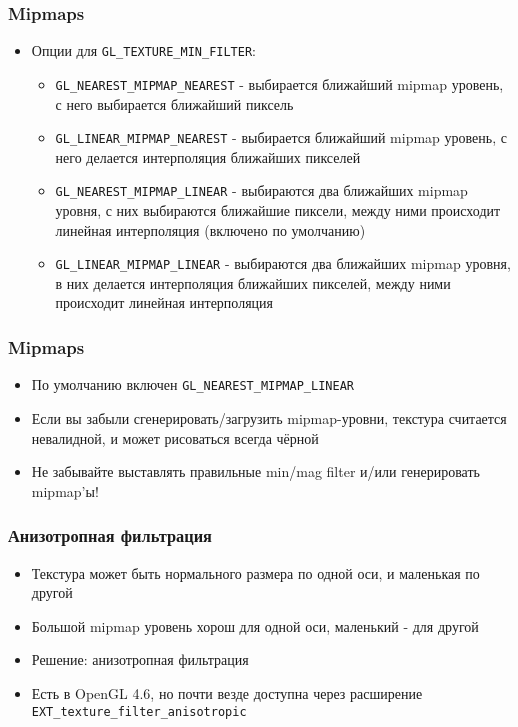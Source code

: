 \documentclass{beamer}
\begin{document}
\begin{frame}[fragile]
\frametitle{Mipmaps}
\begin{itemize}
\item Опции для \verb|GL_TEXTURE_MIN_FILTER|:
\pause
\begin{itemize}
\item \verb|GL_NEAREST_MIPMAP_NEAREST| - выбирается ближайший mipmap уровень, с него выбирается ближайший пиксель
\pause
\item \verb|GL_LINEAR_MIPMAP_NEAREST| - выбирается ближайший mipmap уровень, с него делается интерполяция ближайших пикселей
\pause
\item \verb|GL_NEAREST_MIPMAP_LINEAR| - выбираются два ближайших mipmap уровня, с них выбираются ближайшие пиксели, между ними происходит линейная интерполяция (включено по умолчанию)
\pause
\item \verb|GL_LINEAR_MIPMAP_LINEAR| - выбираются два ближайших mipmap уровня, в них делается интерполяция ближайших пикселей, между ними происходит линейная интерполяция
\end{itemize}
\end{itemize}
\end{frame}

\begin{frame}[fragile]
\frametitle{Mipmaps}
\begin{itemize}
\item По умолчанию включен \verb|GL_NEAREST_MIPMAP_LINEAR|
\item Если вы забыли сгенерировать/загрузить mipmap-уровни, текстура считается невалидной, и может рисоваться всегда чёрной
\item Не забывайте выставлять правильные min/mag filter и/или генерировать mipmap'ы!
\end{itemize}
\end{frame}

\begin{frame}[fragile]
\frametitle{Анизотропная фильтрация}
\begin{itemize}
\item Текстура может быть нормального размера по одной оси, и маленькая по другой
\pause
\item Большой mipmap уровень хорош для одной оси, маленький - для другой
\pause
\item Решение: анизотропная фильтрация
\pause
\item Есть в OpenGL 4.6, но почти везде доступна через расширение \verb|EXT_texture_filter_anisotropic|
\end{itemize}
\end{frame}
\end{document}

